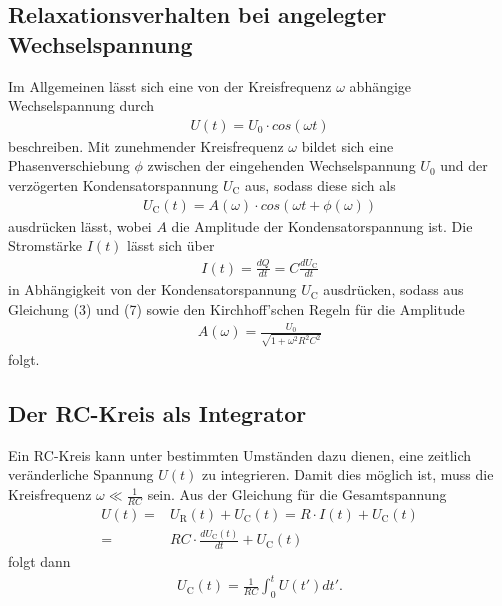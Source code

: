 \subsection{Relaxationsverhalten bei angelegter Wechselspannung}
Im Allgemeinen lässt sich eine von der Kreisfrequenz $\omega$ abhängige Wechselspannung durch
\begin{align}
U(t) = U_\text{0} \cdot cos(\omega t)
\end{align}
beschreiben.
Mit zunehmender Kreisfrequenz $\omega$ bildet sich eine Phasenverschiebung $\phi$ zwischen der 
eingehenden Wechselspannung $U_\text{0}$ und der verzögerten Kondensatorspannung $U_\text{C}$
aus, sodass diese sich als
\begin{align}
U_\text{C}(t) = A(\omega) \cdot cos(\omega t + \phi(\omega))
\end{align}
ausdrücken lässt, wobei $A$ die Amplitude der Kondensatorspannung ist.
Die Stromstärke $I(t)$ lässt sich über
\begin{align}
I(t) = \frac{dQ}{dt} = C \frac{dU_\text{C}}{dt}
\end{align}
in Abhängigkeit von der Kondensatorspannung $U_\text{C}$ ausdrücken, sodass aus 
Gleichung (3) und (7) sowie den Kirchhoff'schen Regeln für die Amplitude
\begin{align}
A(\omega) = \frac{U_\text{0}}{\sqrt{1+\omega^2R^2C^2}}
\end{align}
folgt.

\subsection{Der RC-Kreis als Integrator}
Ein RC-Kreis kann unter bestimmten Umständen dazu dienen, eine zeitlich veränderliche Spannung 
$U(t)$ zu integrieren. Damit dies möglich ist, muss die Kreisfrequenz $\omega \ll \frac{1}{RC}$ sein.
Aus der Gleichung für die Gesamtspannung
\begin{align*}
U(t) = {} & U_\text{R}(t) + U_\text{C}(t) = R \cdot I(t) + U_\text{C}(t) \\
     = {} & RC \cdot \frac{dU_\text{C}(t)}{dt} + U_\text{C}(t)
\end{align*}
folgt dann
\begin{align}
U_\text{C}(t) = \frac{1}{RC} \int_0^t U(t')dt'.
\end{align}
